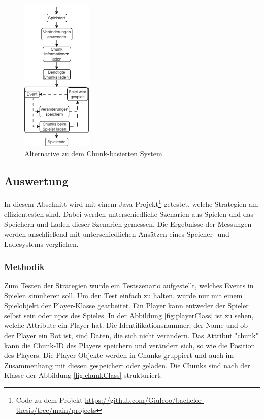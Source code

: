\begin{figure}[htp]
    \centering
    \includegraphics[width=0.3\textwidth]{images/Chunkbasiert2.png}
    \caption{Alternative zu dem Chunk-basierten System}
    \label{fig:altchunkBasedSystem}
\end{figure}


\subsection{Auswertung}
In diesem Abschnitt wird mit einem Java-Projekt\footnote{Code zu dem Projekt \url{https://github.com/Giulcoo/bachelor-thesis/tree/main/projects}} getestet, welche Strategien am effizientesten sind. Dabei werden unterschiedliche Szenarien aus Spielen und das Speichern und Laden dieser Szenarien gemessen. Die Ergebnisse der Messungen werden anschließend mit unterschiedlichen Ansätzen eines Speicher- und Ladesystems verglichen. 

\subsubsection{Methodik}
Zum Testen der Strategien wurde ein Testszenario aufgestellt, welches Events in Spielen simulieren soll. Um den Test einfach zu halten, wurde nur mit einem Spielobjekt der Player-Klasse gearbeitet. Ein Player kann entweder der Spieler selbst sein oder \acp{npc} des Spieles. In der Abbildung \ref{fig:playerClass} ist zu sehen, welche Attribute ein Player hat. Die Identifikationsnummer, der Name und ob der Player ein Bot ist, sind Daten, die sich nicht verändern. Das Attribut "chunk" kann die Chunk-ID des Players speichern und verändert sich, so wie die Position des Players. Die Player-Objekte werden in Chunks gruppiert und auch im Zusammenhang mit diesen gespeichert oder geladen. Die Chunks sind nach der Klasse der Abbildung \ref{fig:chunkClass} strukturiert.

